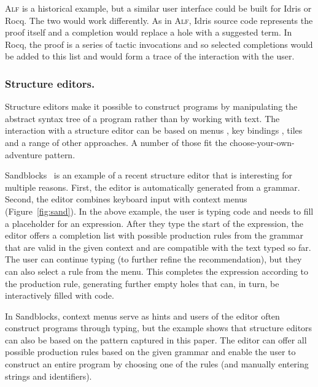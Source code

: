 \documentclass[nonacm,anonymous,sigplan,screen]{acmart}
\begin{document}
\textsc{Alf} is a historical example, but a similar user interface could be built for
Idris or Rocq. The two would work differently. As in \textsc{Alf}, Idris source code
represents the proof itself and a completion would replace a hole with a suggested term. In Rocq,
the proof is a series of tactic invocations and so selected completions would be added to this
list and would form a trace of the interaction with the user.


\subsubsection*{Structure editors.}
Structure editors make it possible to construct programs by manipulating the abstract syntax tree
of a program rather than by working with text. The interaction with a structure
editor can be based on menus \cite{teitelbaum-1981-synth}, key bindings \cite{weber-2017-editors},
tiles~\cite{moon-2022-tylr} and a range of other approaches. A number of those fit
the choose-your-own-adventure pattern.

Sandblocks~\cite{beckmann-2023-all} is an example of a recent structure editor that is interesting
for multiple reasons. First, the editor is automatically generated from a grammar. Second, the
editor combines keyboard input with context menus (Figure~\ref{fig:sand}). In the above example,
the user is typing code and needs to fill a placeholder for an expression. After they type the
start of the expression, the editor offers a completion list with possible production rules from
the grammar that are valid in the given context and are compatible with the text typed so far. The
user can continue typing (to further refine the recommendation), but they can also select a rule
from the menu. This completes the expression according to the production rule, generating further
empty holes that can, in turn, be interactively filled with code.

In Sandblocks, context menus serve as hints and users of the editor often
construct programs through typing, but the example shows that structure editors
can also be based on the pattern captured in this paper. The editor can offer
all possible production rules based on the given grammar and enable the user to construct an
entire program by choosing one of the rules (and manually entering
strings and identifiers).

\end{document}
